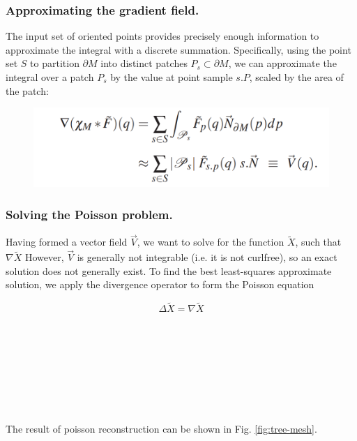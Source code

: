 \documentclass[runningheads,a4paper]{llncs}
\begin{document}
\subsubsection{Approximating the gradient field. } The input set of oriented points provides precisely enough information to approximate the integral with a discrete summation. Specifically, using the point set $S$ to partition $\partial M$ into distinct patches $P_s  \subset \partial M$, we can approximate the integral over a patch $P_s$ by the value at point sample $s.P$, scaled by the area of the patch: 
\begin{figure}
\centering
\includegraphics[scale=0.5]{equation1.PNG}
\end{figure}
 \subsubsection{Solving the Poisson problem.}
Having formed a vector field $\vec{V}$, we want to solve for the function $\tilde{X}$, such that $\nabla \tilde X $
However, $\vec{V}$ is generally not integrable (i.e. it is not curlfree), so an exact solution does not generally exist. To find
the best least-squares approximate solution, we apply the divergence operator to form the Poisson equation

\begin{equation}
\Delta \tilde X = \nabla \tilde X 
\end{equation}
\\
\\
\\
\\
\\
\\
\\
\\
The result of poisson reconstruction can be shown in Fig. \ref{fig:tree-mesh}.
\end{document}
